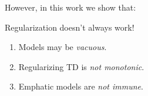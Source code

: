 However, in this work we show that:
\begin{mybox}
    {\headerfont Regularization doesn't always work!}
    \vspace{.5em}
    {\large
        \begin{enumerate}
            \item Models may be \emph{vacuous}.
            \item Regularizing TD is \emph{not monotonic}.
            \item Emphatic models are \emph{not immune}.
        \end{enumerate}
    }
    \vspace{.5em}
\end{mybox}